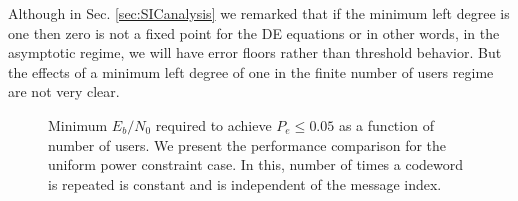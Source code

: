 \begin{remark}
\label{rmrk:mindegreeisone}
Although in Sec. \ref{sec:SICanalysis} we remarked that if the minimum left degree is one then zero is not a fixed point for the DE equations or in other words, in the asymptotic regime, we will have error floors rather than threshold behavior. But the effects of a minimum left degree of one in the finite number of users regime are not very clear. 
\end{remark}





\begin{figure}[h]
\centering
 \resizebox{0.75\textwidth}{!}{}
  \caption{Minimum $E_b/N_0$ required to achieve $P_e\leq 0.05$  as a function of number of users. We present the performance comparison for the uniform power constraint case. In this, number of times a codeword is repeated is constant and is independent of the message index.}
  \label{fig:simulationresults30000}
\end{figure}


